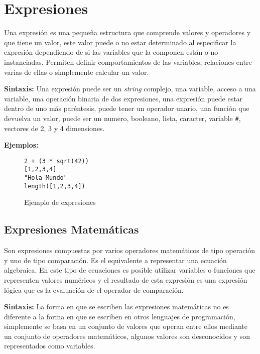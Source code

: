 \section{Expresiones}	
Una expresión es una pequeña estructura que comprende valores y operadores y que 
tiene un valor, este valor puede o no estar determinado al especificar la 
expresión dependiendo de si las variables que la componen están o no instanciadas. 
Permiten definir comportamientos de las variables, relaciones entre varias de 
ellas o simplemente calcular un valor.

\textbf{Sintaxis:} Una expresión puede ser un \emph{string} complejo, una variable, 
acceso a una variable, una operación binaria de dos expresiones, una expresión 
puede estar dentro de uno más paréntesis, puede tener un operador unario, una 
función que devuelva un valor, puede ser un numero, booleano, lista, caracter, 
variable \texttt{\#}, vectores de 2, 3 y 4 dimensiones.

\textbf{Ejemplos:}
\begin{figure}[h]
\begin{lstlisting}[mathescape]
2 + (3 * sqrt(42))
[1,2,3,4]
"Hola Mundo"
length([1,2,3,4])
\end{lstlisting}
\caption[Ejemplos de expresiones]
{Ejemplo de expresiones}
\label{ejemplo_expresiones}
\end{figure}

\subsection{Expresiones Matemáticas}
Son expresiones compuestas por varios operadores matemáticos de tipo operación y
uno de tipo comparación. Es el equivalente a representar una ecuación algebraica.
En este tipo de ecuaciones es posible utilizar variables o funciones que 
representen valores numéricos y el resultado de esta expresión es una expresión 
lógica que es la evaluación de el operador de comparación.

\textbf{Sintaxis:} La forma en que se escriben las expresiones matemáticas no es 
diferente a la forma en que se escriben en otros lenguajes de programación, 
simplemente se basa en un conjunto de valores que operan entre ellos mediante un 
conjunto de operadores matemáticos, algunos valores son desconocidos y son 
representados como variables.

